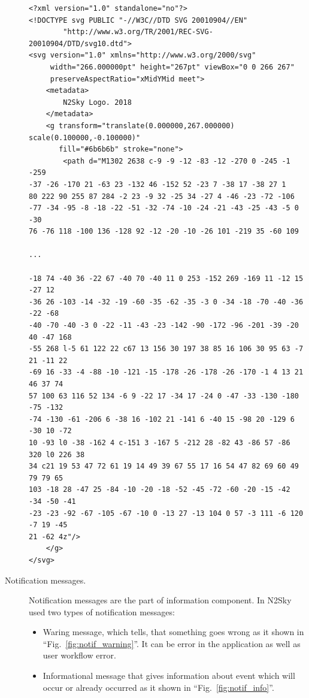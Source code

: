 \begin{description}
\begin{lstlisting}
<?xml version="1.0" standalone="no"?>
<!DOCTYPE svg PUBLIC "-//W3C//DTD SVG 20010904//EN"
        "http://www.w3.org/TR/2001/REC-SVG-20010904/DTD/svg10.dtd">
<svg version="1.0" xmlns="http://www.w3.org/2000/svg"
     width="266.000000pt" height="267pt" viewBox="0 0 266 267"
     preserveAspectRatio="xMidYMid meet">
    <metadata>
        N2Sky Logo. 2018
    </metadata>
    <g transform="translate(0.000000,267.000000) scale(0.100000,-0.100000)"
       fill="#6b6b6b" stroke="none">
        <path d="M1302 2638 c-9 -9 -12 -83 -12 -270 0 -245 -1 -259
-37 -26 -170 21 -63 23 -132 46 -152 52 -23 7 -38 17 -38 27 1
80 222 90 255 87 284 -2 23 -9 32 -25 34 -27 4 -46 -23 -72 -106 
-77 -34 -95 -8 -18 -22 -51 -32 -74 -10 -24 -21 -43 -25 -43 -5 0 -30 
76 -76 118 -100 136 -128 92 -12 -20 -10 -26 101 -219 35 -60 109 

...

-18 74 -40 36 -22 67 -40 70 -40 11 0 253 -152 269 -169 11 -12 15 -27 12 
-36 26 -103 -14 -32 -19 -60 -35 -62 -35 -3 0 -34 -18 -70 -40 -36 -22 -68
-40 -70 -40 -3 0 -22 -11 -43 -23 -142 -90 -172 -96 -201 -39 -20 40 -47 168
-55 268 l-5 61 122 22 c67 13 156 30 197 38 85 16 106 30 95 63 -7 21 -11 22
-69 16 -33 -4 -88 -10 -121 -15 -178 -26 -178 -26 -170 -1 4 13 21 46 37 74
57 100 63 116 52 134 -6 9 -22 17 -34 17 -24 0 -47 -33 -130 -180 -75 -132
-74 -130 -61 -206 6 -38 16 -102 21 -141 6 -40 15 -98 20 -129 6 -30 10 -72
10 -93 l0 -38 -162 4 c-151 3 -167 5 -212 28 -82 43 -86 57 -86 320 l0 226 38
34 c21 19 53 47 72 61 19 14 49 39 67 55 17 16 54 47 82 69 60 49 79 79 65
103 -18 28 -47 25 -84 -10 -20 -18 -52 -45 -72 -60 -20 -15 -42 -34 -50 -41
-23 -23 -92 -67 -105 -67 -10 0 -13 27 -13 104 0 57 -3 111 -6 120 -7 19 -45
21 -62 4z"/>
    </g>
</svg>
\end{lstlisting}

\item[Notification messages.] Notification messages are the part of information component. In N2Sky used two types of notification messages: 
\begin{itemize}
\item Waring message, which tells, that something goes wrong as it shown in ``Fig.~\ref{fig:notif_warning}''. It can be error in the application as well as user workflow error. 
\item Informational message that gives information about event which will occur or already occurred as it shown in ``Fig.~\ref{fig:notif_info}''.
\end{itemize}



\end{description}
